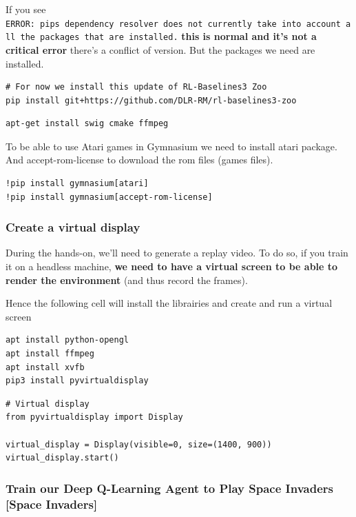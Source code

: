 \documentclass[11pt,a4paper]{article}
\begin{document}
If you see \texttt{ERROR:\ pip\textquotesingle{}s\ dependency\ resolver\ does\ not\ currently\ take\ into\ account\ all\ the\ packages\ that\ are\ installed.} \textbf{this is normal and it's not a critical error} there's a conflict of version. But the packages we need are installed.

\begin{lstlisting}
# For now we install this update of RL-Baselines3 Zoo
pip install git+https://github.com/DLR-RM/rl-baselines3-zoo
\end{lstlisting}

\begin{lstlisting}
apt-get install swig cmake ffmpeg
\end{lstlisting}

To be able to use Atari games in Gymnasium we need to install atari package. And accept-rom-license to download the rom files (games files).

\begin{lstlisting}
!pip install gymnasium[atari]
!pip install gymnasium[accept-rom-license]
\end{lstlisting}

\subsubsection{Create a virtual display}\label{create-a-virtual-display}

During the hands-on, we'll need to generate a replay video. To do so, if you train it on a headless machine, \textbf{we need to have a virtual screen to be able to render the environment} (and thus record the frames).

Hence the following cell will install the librairies and create and run a virtual screen

\begin{lstlisting}
apt install python-opengl
apt install ffmpeg
apt install xvfb
pip3 install pyvirtualdisplay
\end{lstlisting}

\begin{lstlisting}
# Virtual display
from pyvirtualdisplay import Display

virtual_display = Display(visible=0, size=(1400, 900))
virtual_display.start()
\end{lstlisting}

\subsubsection{Train our Deep Q-Learning Agent to Play Space Invaders {[}Space Invaders{]}}\label{train-our-deep-q-learning-agent-to-play-space-invaders-space-invaders}
\end{document}
